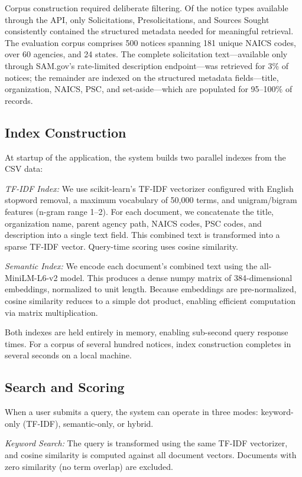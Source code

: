 \documentclass[10pt,twocolumn]{article}
\begin{document}
Corpus construction required deliberate filtering. Of the notice types available through the API, only Solicitations, Presolicitations, and Sources Sought consistently contained the structured metadata needed for meaningful retrieval. The evaluation corpus comprises 500 notices spanning 181 unique NAICS codes, over 60 agencies, and 24 states. The complete solicitation text---available only through SAM.gov's rate-limited description endpoint---was retrieved for 3\% of notices; the remainder are indexed on the structured metadata fields---title, organization, NAICS, PSC, and set-aside---which are populated for 95--100\% of records.

\subsection{Index Construction}

At startup of the application, the system builds two parallel indexes from the CSV data:

\textit{TF-IDF Index:} We use scikit-learn's TF-IDF vectorizer configured with English stopword removal, a maximum vocabulary of 50,000 terms, and unigram/bigram features (n-gram range 1--2). For each document, we concatenate the title, organization name, parent agency path, NAICS codes, PSC codes, and description into a single text field. This combined text is transformed into a sparse TF-IDF vector. Query-time scoring uses cosine similarity.

\textit{Semantic Index:} We encode each document's combined text using the all-MiniLM-L6-v2 model. This produces a dense numpy matrix of 384-dimensional embeddings, normalized to unit length. Because embeddings are pre-normalized, cosine similarity reduces to a simple dot product, enabling efficient computation via matrix multiplication.

Both indexes are held entirely in memory, enabling sub-second query response times. For a corpus of several hundred notices, index construction completes in several seconds on a local machine.

\subsection{Search and Scoring}

When a user submits a query, the system can operate in three modes: keyword-only (TF-IDF), semantic-only, or hybrid.

\textit{Keyword Search:} The query is transformed using the same TF-IDF vectorizer, and cosine similarity is computed against all document vectors. Documents with zero similarity (no term overlap) are excluded.
\end{document}
